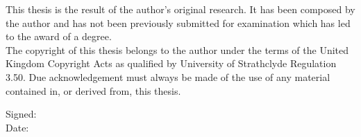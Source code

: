 \pagestyle{empty}
\vspace*{0.2\textheight}

\begin{center}
    \vspace{0.9cm}

    \begin{flushleft}
	
	This thesis is the result of the author's original research. It has been composed by the author and has not been previously submitted for examination which has led to the award of a degree. \\[5pt]
	The copyright of this thesis belongs to the author under the terms of the United Kingdom Copyright Acts as qualified by University of Strathclyde Regulation 3.50. Due acknowledgement must always be made of the use of any material contained in, or derived from, this thesis. \\[5pt]
	\vspace{1cm}
	\end{flushleft}
 
	\begin{flushleft}
		Signed: \\
		\vspace{0.3cm}
		Date: 	
	\end{flushleft}
    
\end{center}

\vspace*{\fill}
\noindent

\cleardoublepage

